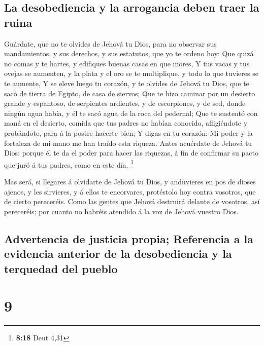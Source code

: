 \hypertarget{la-desobediencia-y-la-arrogancia-deben-traer-la-ruina}{%
\subsection{La desobediencia y la arrogancia deben traer la
ruina}\label{la-desobediencia-y-la-arrogancia-deben-traer-la-ruina}}

 Guárdate, que no te olvides de Jehová tu Dios, para no
observar sus mandamientos, y sus derechos, y sus estatutos, que yo te
ordeno hoy:  Que quizá no comas y te hartes, y edifiques
buenas casas en que mores,  Y tus vacas y tus ovejas se
aumenten, y la plata y el oro se te multiplique, y todo lo que tuvieres
se te aumente,  Y se eleve luego tu corazón, y te olvides
de Jehová tu Dios, que te sacó de tierra de Egipto, de casa de siervos;
 Que te hizo caminar por un desierto grande y espantoso, de
serpientes ardientes, y de escorpiones, y de sed, donde ningún agua
había, y él te sacó agua de la roca del pedernal;  Que te
sustentó con maná en el desierto, comida que tus padres no habían
conocido, afligiéndote y probándote, para á la postre hacerte bien;
 Y digas en tu corazón: Mi poder y la fortaleza de mi mano
me han traído esta riqueza.  Antes acuérdate de Jehová tu
Dios: porque él te da el poder para hacer las riquezas, á fin de
confirmar su pacto que juró á tus padres, como en este día. \footnote{\textbf{8:18}
  Deut 4,31}

 Mas será, si llegares á olvidarte de Jehová tu Dios, y
anduvieres en pos de dioses ajenos, y les sirvieres, y á ellos te
encorvares, protéstolo hoy contra vosotros, que de cierto pereceréis.
 Como las gentes que Jehová destruirá delante de vosotros,
así pereceréis; por cuanto no habréis atendido á la voz de Jehová
vuestro Dios.

\hypertarget{advertencia-de-justicia-propia-referencia-a-la-evidencia-anterior-de-la-desobediencia-y-la-terquedad-del-pueblo}{%
\subsection{Advertencia de justicia propia; Referencia a la evidencia
anterior de la desobediencia y la terquedad del
pueblo}\label{advertencia-de-justicia-propia-referencia-a-la-evidencia-anterior-de-la-desobediencia-y-la-terquedad-del-pueblo}}

\hypertarget{section-8}{%
\section{9}\label{section-8}}

